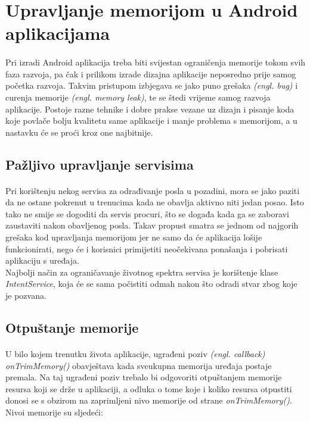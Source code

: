 \documentclass[times, utf8, zavrsni]{fer}
\begin{document}
\section{Upravljanje memorijom u Android aplikacijama}
\paragraph{}
Pri izradi Android aplikacija treba biti svijestan ograničenja memorije tokom svih faza razvoja, pa čak i prilikom izrade dizajna aplikacije neposredno prije samog početka razvoja. Takvim pristupom izbjegava se jako puno grešaka \textit{(engl. bug)} i curenja memorije \textit{(engl. memory leak)}, te se štedi vrijeme samog razvoja aplikacije. Postoje razne tehnike i dobre prakse vezane uz dizajn i pisanje koda koje povlače bolju kvalitetu same aplikacije i manje problema s memorijom, a u nastavku će se proći kroz one najbitnije.

\subsection{Pažljivo upravljanje servisima}
\paragraph{}
Pri korištenju nekog servisa za odrađivanje posla u pozadini, mora se jako paziti da  ne ostane pokrenut u trenucima kada ne obavlja aktivno niti jedan posao. Isto tako ne smije se dogoditi da servis procuri, što se događa kada ga se zaboravi zaustaviti nakon obavljenog posla. Takav propust smatra se jednom od najgorih grešaka kod upravljanja memorijom jer ne samo da će aplikacija lošije funkcionirati, nego će i korisnici primijetiti neočekivana ponašanja i pobrisati aplikaciju s uređaja.\\

Najbolji način za ograničavanje životnog spektra servisa je korištenje klase \textit{IntentService}, koja će se sama počistiti odmah nakon što odradi stvar zbog koje je pozvana.

\subsection{Otpuštanje memorije}
\paragraph{}
U bilo kojem trenutku života aplikacije, ugrađeni poziv \textit{(engl. callback)} \textit{onTrimMemory()} obavještava kada sveukupna memorija uređaja postaje premala. Na taj ugrađeni poziv trebalo bi odgovoriti otpuštanjem memorije resursa koji se drže u aplikaciji, a odluka o tome koje i koliko resursa otpustiti donosi se s obzirom na zaprimljeni nivo memorije od strane \textit{onTrimMemory()}. Nivoi memorije su sljedeći:
\end{document}

